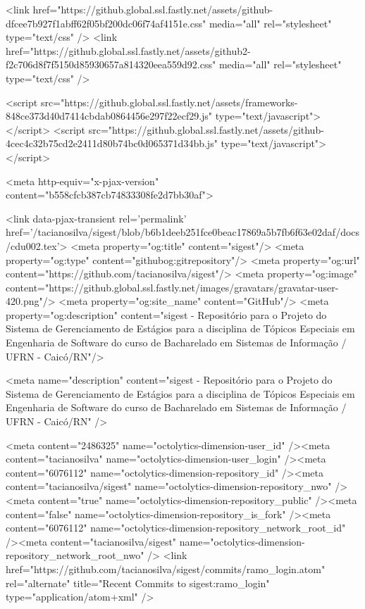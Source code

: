     <link href="https://github.global.ssl.fastly.net/assets/github-dfcee7b927f1abff62f05bf200dc06f74af4151e.css" media="all" rel="stylesheet" type="text/css" />
    <link href="https://github.global.ssl.fastly.net/assets/github2-f2c706d8f7f5150d85930657a814320eea559d92.css" media="all" rel="stylesheet" type="text/css" />
    

    

      <script src="https://github.global.ssl.fastly.net/assets/frameworks-848ce373d40d7414cbdab0864456e297f22ecf29.js" type="text/javascript"></script>
      <script src="https://github.global.ssl.fastly.net/assets/github-4cec4c32b75cd2e2411d80b74bc0d065371d34bb.js" type="text/javascript"></script>
      
      <meta http-equiv="x-pjax-version" content="b558cfcb387cb74833308fe2d7bb30af">

        <link data-pjax-transient rel='permalink' href='/tacianosilva/sigest/blob/b6b1deeb251fce0beac17869a5b7fb6f63e02daf/docs/cdu002.tex'>
  <meta property="og:title" content="sigest"/>
  <meta property="og:type" content="githubog:gitrepository"/>
  <meta property="og:url" content="https://github.com/tacianosilva/sigest"/>
  <meta property="og:image" content="https://github.global.ssl.fastly.net/images/gravatars/gravatar-user-420.png"/>
  <meta property="og:site_name" content="GitHub"/>
  <meta property="og:description" content="sigest - Repositório para o Projeto do Sistema de Gerenciamento de Estágios para a disciplina de Tópicos Especiais em Engenharia de Software do curso de Bacharelado em Sistemas de Informação / UFRN - Caicó/RN"/>

  <meta name="description" content="sigest - Repositório para o Projeto do Sistema de Gerenciamento de Estágios para a disciplina de Tópicos Especiais em Engenharia de Software do curso de Bacharelado em Sistemas de Informação / UFRN - Caicó/RN" />

  <meta content="2486325" name="octolytics-dimension-user_id" /><meta content="tacianosilva" name="octolytics-dimension-user_login" /><meta content="6076112" name="octolytics-dimension-repository_id" /><meta content="tacianosilva/sigest" name="octolytics-dimension-repository_nwo" /><meta content="true" name="octolytics-dimension-repository_public" /><meta content="false" name="octolytics-dimension-repository_is_fork" /><meta content="6076112" name="octolytics-dimension-repository_network_root_id" /><meta content="tacianosilva/sigest" name="octolytics-dimension-repository_network_root_nwo" />
  <link href="https://github.com/tacianosilva/sigest/commits/ramo_login.atom" rel="alternate" title="Recent Commits to sigest:ramo_login" type="application/atom+xml" />

